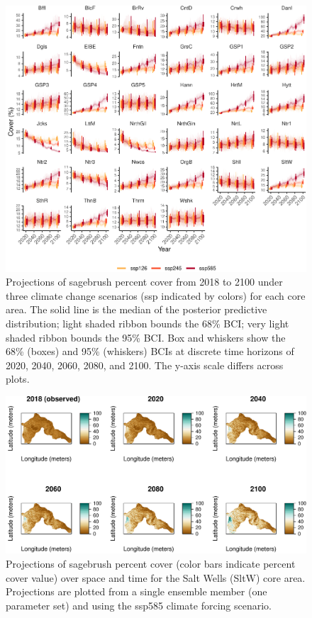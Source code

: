 \documentclass[
  12pt,
]{article}
\begin{document}
\begin{figure}
\centering
\includegraphics{sageCastManuscript_files/figure-latex/projections-1.pdf}
\caption{\label{fig:projections}Projections of sagebrush percent cover from 2018 to 2100 under three climate change scenarios (ssp indicated by colors) for each core area. The solid line is the median of the posterior predictive distribution; light shaded ribbon bounds the 68\% BCI; very light shaded ribbon bounds the 95\% BCI. Box and whiskers show the 68\% (boxes) and 95\% (whiskers) BCIs at discrete time horizons of 2020, 2040, 2060, 2080, and 2100. The y-axis scale differs across plots.}
\end{figure}

\begin{figure}
\centering
\includegraphics{sageCastManuscript_files/figure-latex/spatial-projections-1.pdf}
\caption{\label{fig:spatial-projections}Projections of sagebrush percent cover (color bars indicate percent cover value) over space and time for the Salt Wells (SltW) core area. Projections are plotted from a single ensemble member (one parameter set) and using the ssp585 climate forcing scenario.}
\end{figure}
\end{document}
